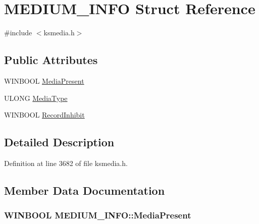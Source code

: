\hypertarget{struct_m_e_d_i_u_m___i_n_f_o}{}\section{M\+E\+D\+I\+U\+M\+\_\+\+I\+N\+FO Struct Reference}
\label{struct_m_e_d_i_u_m___i_n_f_o}


{\ttfamily \#include $<$ksmedia.\+h$>$}

\subsection*{Public Attributes}
\begin{DoxyCompactItemize}
\item 
W\+I\+N\+B\+O\+OL \hyperlink{struct_m_e_d_i_u_m___i_n_f_o_a3af352a55d05637e562ccd40a1964e61}{Media\+Present}
\item 
U\+L\+O\+NG \hyperlink{struct_m_e_d_i_u_m___i_n_f_o_aff94b9e8478b21af9c183b06070adab2}{Media\+Type}
\item 
W\+I\+N\+B\+O\+OL \hyperlink{struct_m_e_d_i_u_m___i_n_f_o_a08b9135c7819f1b2bf10d92713c5c534}{Record\+Inhibit}
\end{DoxyCompactItemize}


\subsection{Detailed Description}


Definition at line 3682 of file ksmedia.\+h.



\subsection{Member Data Documentation}
\subsubsection[{\texorpdfstring{Media\+Present}{MediaPresent}}]{\setlength{\rightskip}{0pt plus 5cm}W\+I\+N\+B\+O\+OL M\+E\+D\+I\+U\+M\+\_\+\+I\+N\+F\+O\+::\+Media\+Present}\hypertarget{struct_m_e_d_i_u_m___i_n_f_o_a3af352a55d05637e562ccd40a1964e61}{}\label{struct_m_e_d_i_u_m___i_n_f_o_a3af352a55d05637e562ccd40a1964e61}


